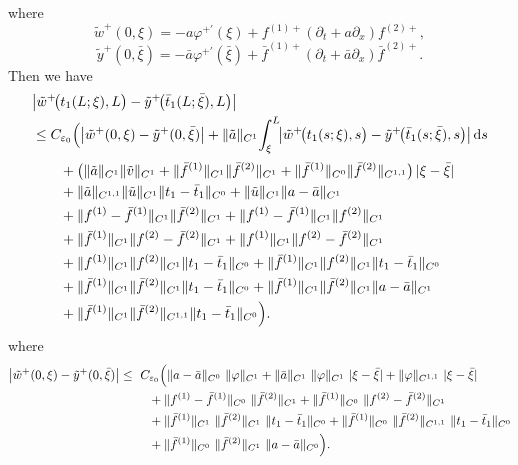 \documentclass[a4paper,reqno,11pt]{amsart}
\numberwithin{equation}{section} %
\begin{document}
where 
$$
\tilde{w}^+(0,\xi )=-a\varphi ^{+\prime}(\xi )+f^{(1)+}\left( \partial _t+a\partial _x \right) f^{(2)+},
$$
$$
\tilde{y}^+(0,\bar{\xi})=-\bar{a}\varphi ^{+\prime}(\bar{\xi})+\bar{f}^{(1)+}\left( \partial _t+\bar{a}\partial _x \right) \bar{f}^{(2)+}.
$$
Then we have
$$
\begin{aligned}
&\bigl|\tilde w^+\!\bigl(t_1(L;\xi),L\bigr)-\tilde y ^+\!\bigl(\bar t_1(L;\bar\xi),L\bigr)\bigr|
\\
&\le C_{\varepsilon_0}\Bigl(
   \bigl|\tilde w^+(0,\xi)-\tilde y ^+(0,\bar\xi)\bigr|
   + \|\tilde a\|_{C^{1}}\!\int_{\xi}^{L}\!\bigl|\tilde w^+\!\bigl(t_1(s;\xi),s\bigr)-\tilde y ^+\!\bigl(\bar t_1(s;\bar\xi),s\bigr)\bigr|\,\mathrm{d}s
\\[2pt]
&\qquad
   + \bigl(\|\tilde a\|_{C^{1}}\|\tilde v\|_{C^{1}}
     + \|\bar f^{(1)}\|_{C^{1}}\|\bar f^{(2)}\|_{C^{1}}
     + \|\bar f^{(1)}\|_{C^{0}}\|\bar f^{(2)}\|_{C^{1,1}}\bigr)\,|\xi-\bar\xi|
\\
&\qquad
   + \|\tilde a\|_{C^{1,1}}\|\tilde u\|_{C^{1}}\|t_1-\bar t_1\|_{C^{0}}
   + \|\tilde u\|_{C^{1}}\|a-\bar a\|_{C^{1}}
\\
&\qquad
   + \|f^{(1)}-\bar f^{(1)}\|_{C^{1}}\|\bar f^{(2)}\|_{C^{1}}
   + \|f^{(1)}-\bar f^{(1)}\|_{C^{1}}\|f^{(2)}\|_{C^{1}}
\\
&\qquad
   + \|\bar f^{(1)}\|_{C^{1}}\|f^{(2)}-\bar f^{(2)}\|_{C^{1}}
   + \|f^{(1)}\|_{C^{1}}\|f^{(2)}-\bar f^{(2)}\|_{C^{1}}
\\
&\qquad
   + \|f^{(1)}\|_{C^{1}}\|f^{(2)}\|_{C^{1}}\|t_1-\bar t_1\|_{C^{0}}
   + \|\bar f^{(1)}\|_{C^{1}}\|f^{(2)}\|_{C^{1}}\|t_1-\bar t_1\|_{C^{0}}
\\
&\qquad
   + \|\bar f^{(1)}\|_{C^{1}}\|\bar f^{(2)}\|_{C^{1}}\|t_1-\bar t_1\|_{C^{0}}
   + \|\bar f^{(1)}\|_{C^{1}}\|\bar f^{(2)}\|_{C^{1}}\|a-\bar a\|_{C^{1}}
\\
&\qquad
   + \|\bar f^{(1)}\|_{C^{1}}\|\bar f^{(2)}\|_{C^{1,1}}\|t_1-\bar t_1\|_{C^{0}}
\Bigr).
\end{aligned}
$$
where
\[
\begin{aligned}
\bigl|\tilde w^+(0,\xi)-\tilde y ^+(0,\bar\xi)\bigr|
\le{}&\ C_{\varepsilon_0}\Bigl(
  \|a-\bar a\|_{C^{0}}\ \|\varphi\|_{C^{1}}
  + \|\bar a\|_{C^{1}}\ \|\varphi\|_{C^{1}}\ |\xi-\bar\xi|
  + \|\varphi\|_{C^{1,1}}\ |\xi-\bar\xi| \\
&\quad + \|f^{(1)}-\bar f^{(1)}\|_{C^{0}}\ \|\bar f^{(2)}\|_{C^{1}}
  + \|\bar f^{(1)}\|_{C^{0}}\ \|f^{(2)}-\bar f^{(2)}\|_{C^{1}} \\
&\quad + \|\bar f^{(1)}\|_{C^{1}}\ \|\bar f^{(2)}\|_{C^{1}}\ \|t_1-\bar t_1\|_{C^{0}}
  + \|\bar f^{(1)}\|_{C^{0}}\ \|\bar f^{(2)}\|_{C^{1,1}}\ \|t_1-\bar t_1\|_{C^{0}} \\
&\quad + \|\bar f^{(1)}\|_{C^{0}}\ \|\bar f^{(2)}\|_{C^{1}}\ \|a-\bar a\|_{C^{0}}
\Bigr).
\end{aligned}
\]
\end{document}
